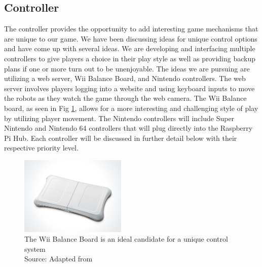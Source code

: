 \documentclass[11pt]{ieeeconf}
\begin{document}
\subsection{Controller}
The controller provides the opportunity to add interesting game mechanisms that are unique to our game. We have been discussing ideas for unique control options and have come up with several ideas. We are developing and interfacing multiple controllers to give players a choice in their play style as well as providing backup plans if one or more turn out to be unenjoyable. The ideas we are pursuing are utilizing a web server, Wii Balance Board, and Nintendo controllers. The web server involves players logging into a website and using keyboard inputs to move the robots as they watch the game through the web camera. The Wii Balance board, as seen in Fig \ref{Wii}, allows for a more interesting and challenging style of play by utilizing player movement. The Nintendo controllers will include Super Nintendo and Nintendo 64 controllers that will plug directly into the Raspberry Pi Hub. Each controller will be discussed in further detail below with their respective priority level.

\begin{figure}[h]
\centering
\captionsetup{justification=centering}
\includegraphics[width=0.45\textwidth]{images/wii.png}
\caption{The Wii Balance Board is an ideal candidate for a unique control system\\ Source: Adapted from \cite{wiiboard:19}}
\label{Wii}
\end{figure}
\end{document}
